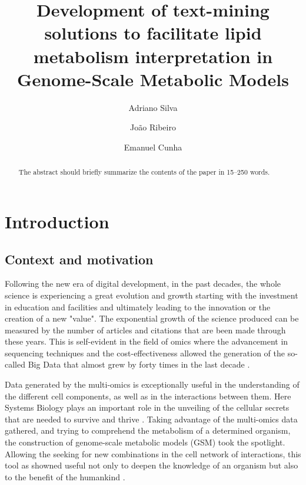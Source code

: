 \documentclass{llncs}
\begin{document}
\pagestyle{myheadings}
\title{Development of text-mining solutions to facilitate lipid metabolism interpretation in Genome-Scale Metabolic Models}

\author{Adriano Silva\and
João Ribeiro\and
Emanuel Cunha}

%
\maketitle              %
%
\begin{abstract}
The abstract should briefly summarize the contents of the paper in
15--250 words.

\end{abstract}
%
%
%
\section{Introduction}
\subsection{Context and motivation}
Following the new era of digital development, in the past decades, the whole science is experiencing a great evolution and growth starting with the investment in education and facilities and ultimately leading to the innovation or the creation of a new "value". 
The exponential growth of the science produced can be measured by the number of articles and citations that are been made through these years\cite{article1,article3}.
This is self-evident in the field of omics where the advancement in sequencing techniques and the cost-effectiveness allowed the generation of the so-called Big Data that almost grew by forty times in the last decade \cite{article2,article3}. 

Data generated by the multi-omics is exceptionally useful in the understanding of the different cell 
components, as well as in the interactions between them. Here Systems Biology plays an important 
role in the unveiling of the cellular secrets that are needed to survive and thrive \cite{article3,article4}.
Taking advantage of the multi-omics data gathered, and trying to comprehend the metabolism of a determined organism,
the construction of genome-scale metabolic models (GSM) took the spotlight. Allowing the seeking for new combinations in the cell network of interactions, this tool as showned useful not only 
to deepen the knowledge of an organism but also to the benefit of the humankind \cite{article3,article5}.
\end{document}
